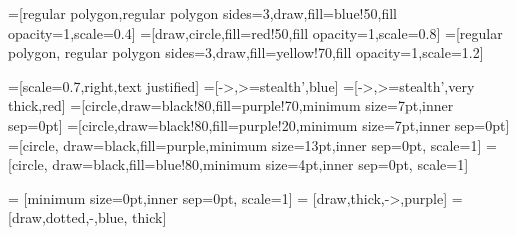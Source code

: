 =[regular polygon,regular polygon sides=3,draw,fill=blue!50,fill opacity=1,scale=0.4]
=[draw,circle,fill=red!50,fill opacity=1,scale=0.8]
=[regular polygon, regular polygon sides=3,draw,fill=yellow!70,fill opacity=1,scale=1.2]

=[scale=0.7,right,text justified]
=[->,>=stealth',blue]
=[->,>=stealth',very thick,red]
	=[circle,draw=black!80,fill=purple!70,minimum size=7pt,inner sep=0pt]
	=[circle,draw=black!80,fill=purple!20,minimum size=7pt,inner sep=0pt]
			=[circle, draw=black,fill=purple,minimum size=13pt,inner sep=0pt, scale=1]
		=[circle, draw=black,fill=blue!80,minimum size=4pt,inner sep=0pt, scale=1]

		= [minimum size=0pt,inner sep=0pt, scale=1]
 	= [draw,thick,->,purple]
 	= [draw,dotted,-,blue, thick]

